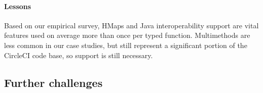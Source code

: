 

\paragraph{Lessons}
Based on our empirical survey, HMaps and Java interoperability support
are vital features used on average more than once per typed
function. 
%
Multimethods are less common in our case studies, but still represent a significant
portion of the CircleCI code base, so support is still necessary.
%


%

\subsection{Further challenges}
\label{sec:limitations}

